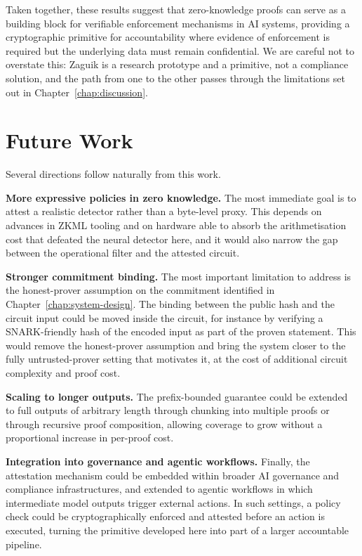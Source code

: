 \medskip

Taken together, these results suggest that zero-knowledge proofs can serve as a building block for verifiable enforcement mechanisms in AI systems, providing a cryptographic primitive for accountability where evidence of enforcement is required but the underlying data must remain confidential. We are careful not to overstate this: Zaguik is a research prototype and a primitive, not a compliance solution, and the path from one to the other passes through the limitations set out in Chapter~\ref{chap:discussion}.

\section{Future Work}
\label{sec:concl-future}

Several directions follow naturally from this work.

\medskip

\textbf{More expressive policies in zero knowledge.} The most immediate goal is to attest a realistic detector rather than a byte-level proxy. This depends on advances in ZKML tooling and on hardware able to absorb the arithmetisation cost that defeated the neural detector here, and it would also narrow the gap between the operational filter and the attested circuit.

\medskip

\textbf{Stronger commitment binding.} The most important limitation to address is the honest-prover assumption on the commitment identified in Chapter~\ref{chap:system-design}. The binding between the public hash and the circuit input could be moved inside the circuit, for instance by verifying a SNARK-friendly hash of the encoded input as part of the proven statement. This would remove the honest-prover assumption and bring the system closer to the fully untrusted-prover setting that motivates it, at the cost of additional circuit complexity and proof cost.

\medskip

\textbf{Scaling to longer outputs.} The prefix-bounded guarantee could be extended to full outputs of arbitrary length through chunking into multiple proofs or through recursive proof composition, allowing coverage to grow without a proportional increase in per-proof cost.

\medskip

\textbf{Integration into governance and agentic workflows.} Finally, the attestation mechanism could be embedded within broader AI governance and compliance infrastructures, and extended to agentic workflows in which intermediate model outputs trigger external actions. In such settings, a policy check could be cryptographically enforced and attested before an action is executed, turning the primitive developed here into part of a larger accountable pipeline.
